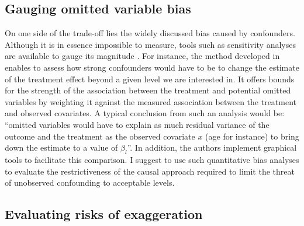 \documentclass[usletter, 12pt]{article}
\begin{document}
	
		\subsection{Gauging omitted variable bias}
	
			On one side of the trade-off lies the widely discussed bias caused by confounders. Although it is in essence impossible to measure, tools such as sensitivity analyses are available to gauge its magnitude \citep{rosenbaum_observational_2002, middleton_bias_2016, oster_unobservable_2019, cinelli_making_2020}. For instance, the method developed in \cite{cinelli_making_2020} enables to assess how strong confounders would have to be to change the estimate of the treatment effect beyond a given level we are interested in. It offers bounds for the strength of the association between the treatment and potential omitted variables by weighting it against the measured association between the treatment and observed covariates. A typical conclusion from such an analysis would be: ``omitted variables would have to explain as much residual variance of the outcome and the treatment as the observed covariate $x$ (age for instance) to bring down the estimate to a value of $\beta_{l}$''. In addition, the authors implement graphical tools to facilitate this comparison. I suggest to use such quantitative bias analyses to evaluate the restrictiveness of the causal approach required to limit the threat of unobserved confounding to acceptable levels. 
			
		\subsection{Evaluating risks of exaggeration}
\end{document}
